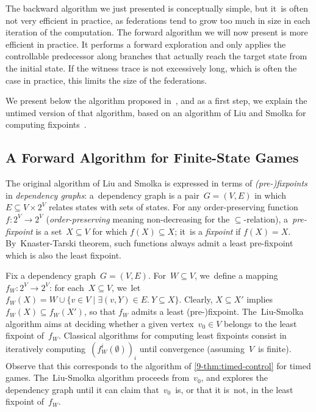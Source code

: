 The backward algorithm we just presented is conceptually simple, but
it~is often not very efficient in practice,
as federations tend to grow too much in size in each iteration of the
computation.
The forward algorithm we will now present is more efficient in practice.
It performs a forward exploration and only applies the controllable predecessor along branches
that actually reach the target state from the initial state. If the witness
trace is not excessively long, which is often the case in practice,
this limits the size of the federations.


We present below the algorithm proposed in~\cite{CDFLL05},
and as a first step, we explain the untimed version of that algorithm,
based on an algorithm of Liu and Smolka for computing
fixpoints~\cite{LS98}.


\subsection*{A Forward Algorithm for Finite-State Games}

The original algorithm of Liu and Smolka is expressed in terms of
\emph{(pre-)fixpoints} in \emph{dependency graphs}: a~dependency graph
is a pair~$G=(V,E)$ in which $E \subseteq V \times 2^V$ relates
states with sets of states.
%
For any order-preserving 
function~$f\colon 2^V\to2^V$
(\emph{order-preserving} meaning non-decreasing for the $\subseteq$-relation),
a~\emph{pre-fixpoint} is a set~$X\subseteq V$ for which $f(X)\subseteq X$; 
it~is a \emph{fixpoint} if $f(X)=X$. By~Knaster-Tarski theorem, such functions always admit a least pre-fixpoint which is also the least fixpoint.

Fix a dependency graph~$G=(V,E)$. 
For~$W\subseteq V$,
we~define a mapping $f_W\colon 2^V\to 2^V$: for
each~$X\subseteq V$, we~let $f_W(X)=W\cup \{v\in V\mid \exists (v,Y)\in
E.\ Y\subseteq X\}$.
%
Clearly, $X\subseteq X'$ implies $f_W(X)\subseteq f_W(X')$, so that $f_W$ admits
a least (pre-)fixpoint.
The~Liu-Smolka
algorithm aims at deciding whether a given vertex~$v_0\in V$ belongs
to the least fixpoint of~$f_W$.  Classical algorithms for computing
least fixpoints consist in iteratively
computing~$(f_W^i(\emptyset))_i$ until convergence (assuming~$V$~is
finite). Observe that this corresponds to the algorithm of \cref{9-thm:timed-control}
for timed games.
The~Liu-Smolka algorithm proceeds from~$v_0$, and explores
the dependency graph until it can claim that~$v_0$~is, or that it
is~not, in the least fixpoint of~$f_W$.



